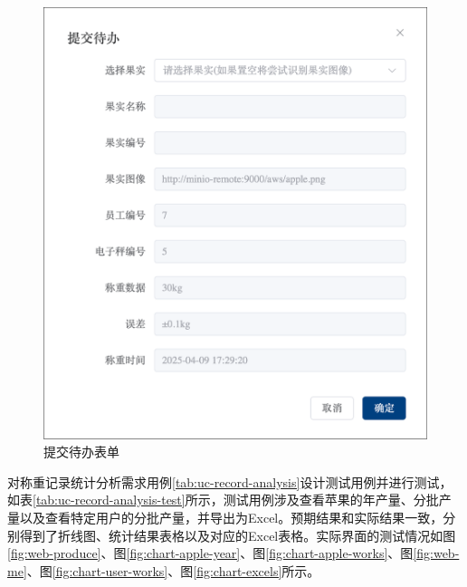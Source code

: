 \begin{figure}
    \centering
    \includegraphics[width=0.8\linewidth]{../result/form-todo-handle.png}
    \caption{提交待办表单}
    \label{fig:form-todo-handle}
\end{figure}

对称重记录统计分析需求用例\ref{tab:uc-record-analysis}设计测试用例并进行测试，如表\ref{tab:uc-record-analysis-test}所示，测试用例涉及查看苹果的年产量、分批产量以及查看特定用户的分批产量，并导出为Excel。预期结果和实际结果一致，分别得到了折线图、统计结果表格以及对应的Excel表格。实际界面的测试情况如图\ref{fig:web-produce}、图\ref{fig:chart-apple-year}、图\ref{fig:chart-apple-works}、图\ref{fig:web-me}、图\ref{fig:chart-user-works}、图\ref{fig:chart-excels}所示。

